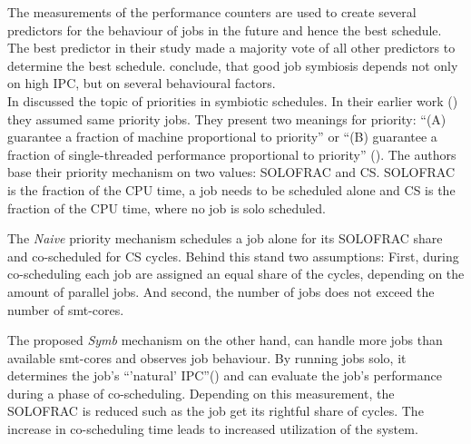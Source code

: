 The measurements of the performance counters are used to create several
predictors for the behaviour of jobs in the future and hence the best schedule.
The best predictor in their study made a majority vote of all other predictors
to determine the best schedule.
\citeauthor{snavely_symbiotic_2000} conclude, that good job symbiosis depends
not only on high IPC, but on several behavioural factors.
\\


In \citeyear{snavely_symbiotic_2002} \citeauthor{snavely_symbiotic_2002}
discussed the topic of priorities in symbiotic schedules.
In their earlier work (\cite{snavely_symbiotic_2000}) they assumed same
priority jobs.
They present two meanings for priority: ``(A) guarantee a fraction of machine
proportional to priority'' or ``(B) guarantee a fraction of single-threaded
performance proportional to priority'' (\cite{snavely_symbiotic_2002}).
The authors base their priority mechanism on two values: SOLOFRAC and CS.
SOLOFRAC is the fraction of the CPU time, a job needs to be scheduled alone
and CS is the fraction of the CPU time, where no job is solo scheduled.

The \textit{Naive} priority mechanism schedules a job alone for its SOLOFRAC
share and co-scheduled for CS cycles. Behind this stand two assumptions: First,
during co-scheduling each job are assigned an equal share of the cycles,
depending on the amount of parallel jobs. And second, the number of jobs does
not exceed the number of \gls{smt}-cores.

The proposed \textit{Symb} mechanism on the other hand, can handle more jobs
than available \gls{smt}-cores and observes job behaviour. By running jobs
solo, it determines the job's ``'natural' IPC''(\cite{snavely_symbiotic_2002})
and can evaluate the job's performance during a phase of co-scheduling.
Depending on this measurement, the SOLOFRAC is reduced such as the job get its
rightful share of cycles. The increase in co-scheduling time leads to increased
utilization of the system.



